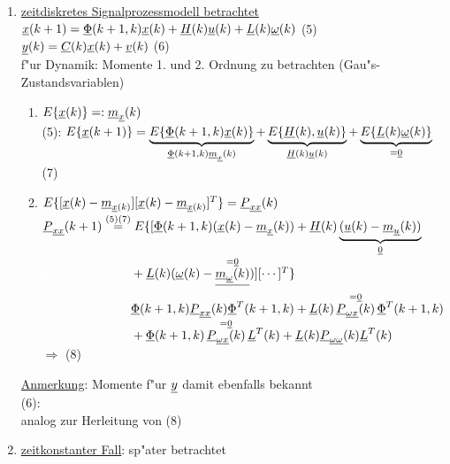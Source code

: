 \documentclass[openany,a4paper,11pt]{book}
\begin{document}
\begin{enumerate}[label=(\Alph*)]
    \item \uline{zeitdiskretes Signalprozessmodell betrachtet}\\
    $\uline{x}(k+1)=\uline{\Phi}(k+1,k)\uline{x}(k)+\uline{H}(k)\uline{u}(k)+\uline{L}(k)\uline{\omega}(k)$ \quad (5)\\
    $\uline{y}(k)=\uline{C}(k)\uline{x}(k)+\uline{v}(k)$ \quad (6)\\
    f"ur Dynamik: Momente 1. und 2. Ordnung zu betrachten (Gau"s-Zustandsvariablen)\begin{enumerate}
        \item $E\{\uline{x}(k)\}=:\uline{m}_{\uline{x}}(k)$\\
        (5): $E\{\uline{x}(k+1)\}=\underbrace{E\{\uline{\Phi}(k+1,k)\uline{x}(k)\}}_{\uline{\Phi}(k+1,k)\uline{m}_{\uline{x}}(k)}+\underbrace{E\{\uline{H}(k),\uline{u}(k)\}}_{\uline{H}(k)\uline{u}(k)}+\underbrace{E\{\uline{L}(k)\uline{\omega}(k)\}}_{=\uline{0}}$\\
         \quad (7)\\
        \item $E\{[\uline{x}(k)-\uline{m}_{\uline{x}(k)}][\uline{x}(k)-\uline{m}_{\uline{x}(k)}]^T\}=\uline{P}_{\uline{xx}}(k)$\\
        $\uline{P}_{\uline{xx}}(k+1)\stackrel{(5)(7)}{=}E\{[\uline{\Phi}(k+1,k)(\uline{x}(k)-\uline{m}_{\uline{x}}(k))+\uline{H}(k)\underbrace{(\uline{u}(k)-\uline{m}_{\uline{u}}(k))}_{\uline{0}}$\\
        ${\color{white}\uline{P}_{\uline{xx}}(k+1)\stackrel{(5)(7)}{=}}+\uline{L}(k)(\uline{\omega}(k)-\mathop{\sout{\uline{m}_{\uline{\omega}}(k)}}\limits^{=\uline{0}})][\cdots]^T\}$\\
        ${\color{white}\uline{P}_{\uline{xx}}(k+1)\stackrel{(5)(7)}{=}}\uline{\Phi}(k+1,k)\uline{P}_{\uline{xx}}(k)\uline{\Phi}^T(k+1,k)+\uline{L}(k)\mathop{\uline{P}_{\uline{\omega x}}(k)}\limits^{=\uline{0}}\uline{\Phi}^T(k+1,k)$\\
        ${\color{white}\uline{P}_{\uline{xx}}(k+1)\stackrel{(5)(7)}{=}}+\uline{\Phi}(k+1,k)\mathop{\uline{P}_{\uline{\omega x}}(k)}\limits^{=\uline{0}}\uline{L}^T(k)+\uline{L}(k)\uline{P}_{\uline{\omega\omega}}(k)\uline{L}^T(k)$\\
        $\Rightarrow$  \quad (8)
    \end{enumerate}
    \uline{Anmerkung}: Momente f"ur $\uline{y}$ damit ebenfalls bekannt\\
    (6): \\
    analog zur Herleitung von (8)\\
    \item \uline{zeitkonstanter Fall}: sp"ater betrachtet
\end{enumerate}
\end{document}
